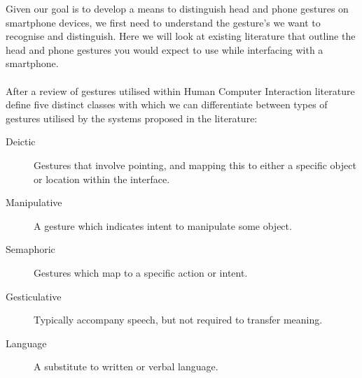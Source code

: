


Given our goal is to develop a means to distinguish head and phone gestures on smartphone devices, we first need to understand the gesture's we want to recognise and distinguish.
Here we will look at existing literature that outline the head and phone gestures you would expect to use while interfacing with a smartphone.
\\\\
%
After a review of gestures utilised within Human Computer Interaction literature \citeauthor{karam2005taxonomy} define five distinct classes with which we can differentiate between types of gestures utilised by the systems proposed in the literature\cite{karam2005taxonomy}:
\begin{description}
    \item[Deictic] Gestures that involve pointing, and mapping this to either a specific object or location within the interface.
    \item[Manipulative] A gesture which indicates intent to manipulate some object.
    \item[Semaphoric] Gestures which map to a specific action or intent.
    \item[Gesticulative] Typically accompany speech, but not required to transfer meaning.
    \item[Language] A substitute to written or verbal language.
\end{description}

